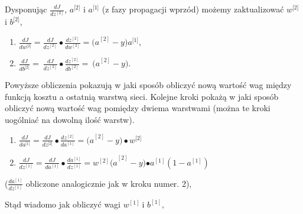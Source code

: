 Dysponując \(\frac{dJ}{dz^{\left\lbrack 2 \right\rbrack}}\),
\(a^{\lbrack 2\rbrack}\) i \(a^{\lbrack 1\rbrack}\) (z fazy propagacji
wprzód) możemy zaktualizować \(w^{\lbrack 2\rbrack}\) i
\(b^{\lbrack 2\rbrack}\),

\begin{enumerate}
\def\labelenumi{\arabic{enumi}.}
\setcounter{enumi}{3}
\item
  \(\frac{dJ}{dw^{\lbrack 2\rbrack}} = \frac{dJ}{dz^{\left\lbrack 2 \right\rbrack}} \bullet \frac{dz^{\left\lbrack 2 \right\rbrack}}{dw^{\left\lbrack 2 \right\rbrack}} = {(a}^{\left\lbrack 2 \right\rbrack} - y)a^{\lbrack 1\rbrack}\),
\item
  \(\frac{dJ}{db^{\lbrack 2\rbrack}} = \ \frac{dJ}{dz^{\left\lbrack 2 \right\rbrack}} \bullet \frac{dz^{\left\lbrack 2 \right\rbrack}}{db^{\left\lbrack 2 \right\rbrack}} = \ {(a}^{\left\lbrack 2 \right\rbrack} - y)\).
\end{enumerate}

Powyższe obliczenia pokazują w jaki sposób obliczyć nową wartość wag między funkcją kosztu a ostatnią warstwą sieci. Kolejne kroki pokażą w jaki sposób obliczyć nową wartość wag pomiędzy dwiema warstwami (można te kroki uogólniać na dowolną ilość warstw).

\begin{enumerate}
\def\labelenumi{\arabic{enumi}.}
\setcounter{enumi}{5}
\item
  \(\frac{dJ}{da^{\lbrack 1\rbrack}} = \frac{dJ}{dz^{\lbrack 2\rbrack}} \bullet \frac{dz^{\left\lbrack 2 \right\rbrack}}{da^{\left\lbrack 1 \right\rbrack}} = {(a}^{\left\lbrack 2 \right\rbrack} - y) \bullet w^{\lbrack 2\rbrack}\)
\item
  \(\frac{dJ}{dz^{\left\lbrack 1 \right\rbrack}} = \frac{dJ}{da^{\left\lbrack 1 \right\rbrack}} \bullet \frac{da^{\left\lbrack 1 \right\rbrack}}{dz^{\left\lbrack 1 \right\rbrack}} = {w^{\left\lbrack 2 \right\rbrack}(a}^{\left\lbrack 2 \right\rbrack} - y){\bullet a}^{\left\lbrack 1 \right\rbrack}(1 - a^{\left\lbrack 1 \right\rbrack})\)
\end{enumerate}

(\(\frac{da^{\left\lbrack 1 \right\rbrack}}{dz^{\left\lbrack 1 \right\rbrack}}\)
obliczone analogicznie jak w kroku numer. 2),

Stąd wiadomo jak obliczyć wagi \(w^{\left\lbrack 1 \right\rbrack}\ \)i
\(b^{\left\lbrack 1 \right\rbrack},\)

